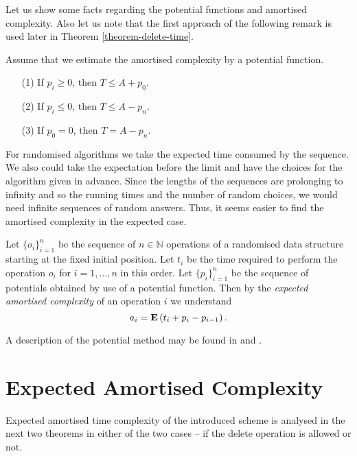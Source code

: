 Let us show some facts regarding the potential functions and amortised complexity. Also let us note that the first approach of the following remark is used later in Theorem \ref{theorem-delete-time}.
\begin{claim}
\label{claim-amortised-complexity}
Assume that we estimate the amortised complexity by a potential function.
\begin{enumerate}
\item [(1)] If $p_i \geq 0$, then $T \leq A + p_0$.
\item [(2)] If $p_i \leq 0$, then $T \leq A - p_n$.
\item [(3)] If $p_0 = 0$, then $T = A - p_n$.
\end{enumerate}
\end{claim}

For randomised algorithms we take the expected time consumed by the sequence. We also could take the expectation before the limit and have the choices for the algorithm given in advance. Since the lengths of the sequences are prolonging to infinity and so the running times and the number of random choices, we would need infinite sequences of random answers. Thus, it seems easier to find the amortised complexity in the expected case.

\begin{definition}
Let $\{o_i\}_{i = 1}^{n}$ be the sequence of $n \in \mathbb{N}$ operations of a randomised data structure starting at the fixed initial position. Let $t_i$ be the time required to perform the operation $o_i$ for $i = 1, \dots, n$ in this order. Let $\{p_i\}_{i = 1}^{n}$ be the sequence of potentials obtained by use of a potential function. Then by the \emph{expected amortised complexity} of an operation $i$ we understand \[ a_i = \mathbf{E}\left(t_i + p_i - p_{i - 1}\right) \text{.} \]
\end{definition}

A description of the potential method may be found in \cite{VK-skripta} and \cite{DBLP:books/sp/MehlhornS2008}.

\section{Expected Amortised Complexity}
\label{section-expected-amortised-complexity}
Expected amortised time complexity of the introduced scheme is analysed in the next two theorems in either of the two cases -- if the delete operation is allowed or not.

